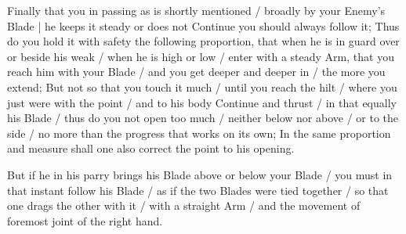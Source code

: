 
Finally that you in passing as is shortly mentioned / broadly by your
Enemy's Blade | he keeps it steady or does not Continue you should
always follow it; Thus do you hold it with safety the following
proportion, that when he is in guard over or beside his weak / when he
is high or low / enter with a steady Arm, that you reach him with your
Blade / and you get deeper and deeper in / the more you extend; But
not so that you touch it much / until you reach the hilt / where you
just were with the point / and to his body Continue and thrust / in
that equally his Blade / thus do you not open too much / neither below
nor above / or to the side / no more than the progress that works on
its own; In the same proportion and measure shall one also correct the
point to his opening.


But if he in his parry brings his Blade above or below your Blade /
you must in that instant follow his Blade / as if the two Blades were
tied together / so that one drags the other with it / with a straight
Arm / and the movement of foremost joint of the right hand.


